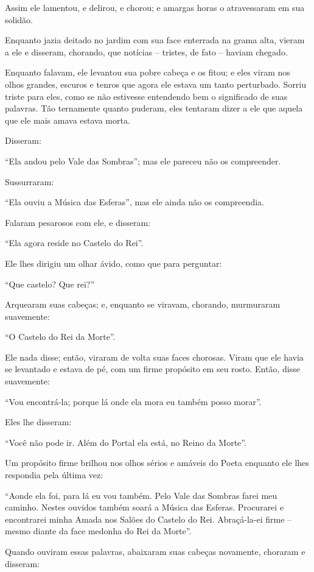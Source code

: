 Assim ele lamentou, e delirou, e chorou; e amargas horas o atravessaram
em sua solidão.

Enquanto jazia deitado no jardim com sua face enterrada na grama alta,
vieram a ele e disseram, chorando, que notícias -- tristes, de fato --
haviam chegado.

Enquanto falavam, ele levantou sua pobre cabeça e os fitou; e eles viram
nos olhos grandes, escuros e tenros que agora ele estava um tanto
perturbado. Sorriu triste para eles, como se não estivesse entendendo
bem o significado de suas palavras. Tão ternamente quanto puderam, eles
tentaram dizer a ele que aquela que ele mais amava estava morta.


Disseram:

``Ela andou pelo Vale das Sombras''; mas ele pareceu não os compreender.

Sussurraram:

``Ela ouviu a Música das Esferas'', mas ele ainda não os compreendia.

Falaram pesarosos com ele, e disseram:

``Ela agora reside no Castelo do Rei''.

Ele lhes dirigiu um olhar ávido, como que para perguntar:

``Que castelo? Que rei?''

Arquearam suas cabeças; e, enquanto se viravam, chorando, murmuraram
suavemente:

``O Castelo do Rei da Morte''.

Ele nada disse; então, viraram de volta suas faces chorosas. Viram que
ele havia se levantado e estava de pé, com um firme propósito em seu
rosto. Então, disse suavemente:

``Vou encontrá-la; porque lá onde ela mora eu também posso morar''.

Eles lhe disseram:

``Você não pode ir. Além do Portal ela está, no Reino da Morte''.

Um propósito firme brilhou nos olhos sérios e amáveis do Poeta enquanto
ele lhes respondia pela última vez:

``Aonde ela foi, para lá eu vou também. Pelo Vale das Sombras farei meu
caminho. Nestes ouvidos também soará a Música das Esferas. Procurarei e
encontrarei minha Amada nos Salões do Castelo do Rei. Abraçá-la-ei firme
-- mesmo diante da face medonha do Rei da Morte''.

Quando ouviram essas palavras, abaixaram suas cabeças novamente,
choraram e disseram:

